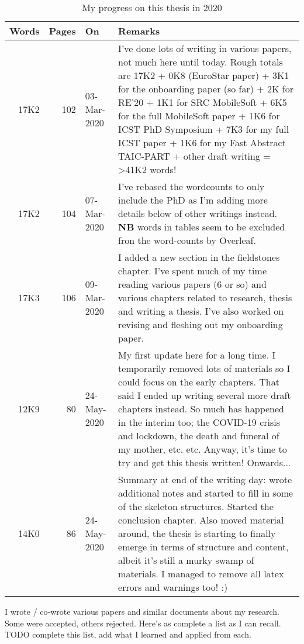 \begin{table}[htpb]
    \centering
    \footnotesize
    \begin{tabular}{r|r|l|p{7cm}}
     Words &Pages  &On &Remarks\\
         \hline
         17K2 &102 &03-Mar-2020 &I've done lots of writing in various papers, not much here until today. Rough totals are 17K2 + 0K8 (EuroStar paper) + 3K1 for the onboarding paper (so far) + 2K for RE'20 + 1K1 for SRC MobileSoft + 6K5 for the full MobileSoft paper + 1K6 for ICST PhD Symposium + 7K3 for my full ICST paper + 1K6 for my Fast Abstract TAIC-PART + other draft writing = >41K2 words!\\
         17K2 &104 &07-Mar-2020 &I've rebased the wordcounts to only include the PhD as I'm adding more details below of other writings instead. \textbf{NB} words in tables seem to be excluded fron the word-counts by Overleaf.\\
         17K3 &106 &09-Mar-2020 &I added a new section in the fieldstones chapter. I've spent much of my time reading various papers (6 or so) and various chapters related to research, thesis and writing a thesis. I've also worked on revising and fleshing out my onboarding paper.\\
         12K9 &80 &24-May-2020 &My first update here for a long time. I temporarily removed lots of materials so I could focus on the early chapters. That said I ended up writing several more draft chapters instead. So much has happened in the interim too; the COVID-19 crisis and lockdown, the death and funeral of my mother, etc. etc. Anyway, it's time to try and get this thesis written! Onwards...\\
         14K0 &86 &24-May-2020 &Summary at end of the writing day: wrote additional notes and started to fill in some of the skeleton structures. Started the conclusion chapter. Also moved material around, the thesis is starting to finally emerge in terms of structure and content, albeit it's still a murky swamp of materials. I managed to remove all latex errors and warnings too! :)\\
         
    \end{tabular}
    \caption{My progress on this thesis in 2020}
    \label{tab:my_progress_on_this_thesis_2020}
\end{table}

I wrote / co-wrote various papers and similar documents about my research. Some were accepted, others rejected. Here's as complete a list as I can recall. TODO complete this list, add what I learned and applied from each.

